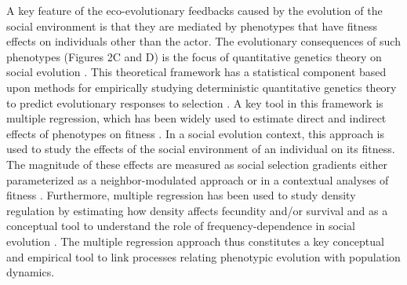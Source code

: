 \documentclass{article}
\begin{document}
 A key feature of the eco-evolutionary feedbacks caused by the evolution of the social environment is that they are mediated by phenotypes that have fitness effects on individuals other than the actor. The evolutionary consequences of such phenotypes (Figures 2C and D) is the focus of quantitative genetics theory on social evolution \citep{frank1998foundations, Araya-Ajoy2020}.  This theoretical framework has a statistical component based upon methods for empirically studying deterministic quantitative genetics theory to predict evolutionary responses to selection \citep{Robertson1966, Lande1976, Lande1979, Lande1983}. A key tool in this framework is multiple regression, which has been widely used to estimate direct and indirect effects of phenotypes on fitness \citep{Kingsolver2011}. In a social evolution context, this approach is used to study the effects of the social environment of an individual on its fitness. The magnitude of these effects are measured as social selection gradients \citep{Wolf1999SocialSelection} either parameterized as a neighbor-modulated approach \citep{Okasha2006} or in a contextual analyses of fitness \citep{Heisler1987, Goodnight1992}. Furthermore, multiple regression has been used to study density regulation by estimating how density affects fecundity and/or survival \citep{Araya-Ajoy2021, Saether2021} and as a conceptual tool to understand the role of frequency-dependence in social evolution \citep{Araya-Ajoy2020, Westneat2012a}. The multiple regression approach thus constitutes a key conceptual and empirical tool to link processes relating phenotypic evolution with population dynamics. 
\end{document}
